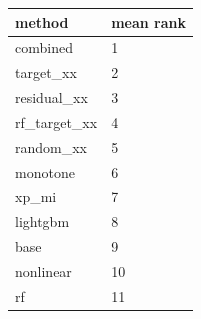 \begin{tabular}{ll}
\toprule
method & mean rank \\
\midrule
combined & 1 \\
target\_xx & 2 \\
residual\_xx & 3 \\
rf\_target\_xx & 4 \\
random\_xx & 5 \\
monotone & 6 \\
xp\_mi & 7 \\
lightgbm & 8 \\
base & 9 \\
nonlinear & 10 \\
rf & 11 \\
\bottomrule
\end{tabular}
